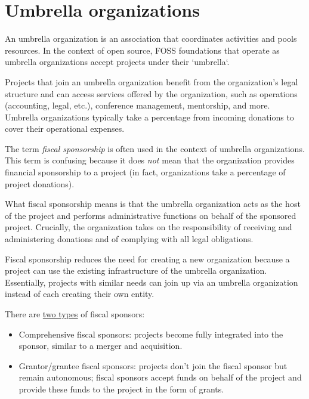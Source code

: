 


\chapter{Umbrella organizations}

An umbrella organization is an association that coordinates activities and pools resources.  In the context of open source, FOSS foundations that operate as umbrella organizations accept projects under their `umbrella`.

Projects that join an umbrella organization benefit from the organization's legal structure and can access services offered by the organization, such as operations (accounting, legal, etc.), conference management, mentorship, and more.  Umbrella organizations typically take a percentage from incoming donations to cover their operational expenses.

The term \textit{fiscal sponsorship} is often used in the context of umbrella organizations.  This term is confusing because it does \textit{not} mean that the organization provides financial sponsorship to a project (in fact, organizations take a percentage of project donations).

What fiscal sponsorship means is that the umbrella organization acts as the host of the project and performs administrative functions on behalf of the sponsored project.  Crucially, the organization takes on the responsibility of receiving and administering donations and of complying with all legal obligations.

Fiscal sponsorship reduces the need for creating a new organization because a project can use the existing infrastructure of the umbrella organization.  Essentially, projects with similar needs can join up via an umbrella organization instead of each creating their own entity.

There are \href{https://lwn.net/Articles/548542/}{two types} of fiscal sponsors:

\begin{itemize}

\itemsep 0.50em

\item Comprehensive fiscal sponsors: projects become fully integrated into the sponsor, similar to a merger and acquisition.

\item Grantor/grantee fiscal sponsors: projects don't join the fiscal sponsor but remain autonomous; fiscal sponsors accept funds on behalf of the project and provide these funds to the project in the form of grants.

\end{itemize}

